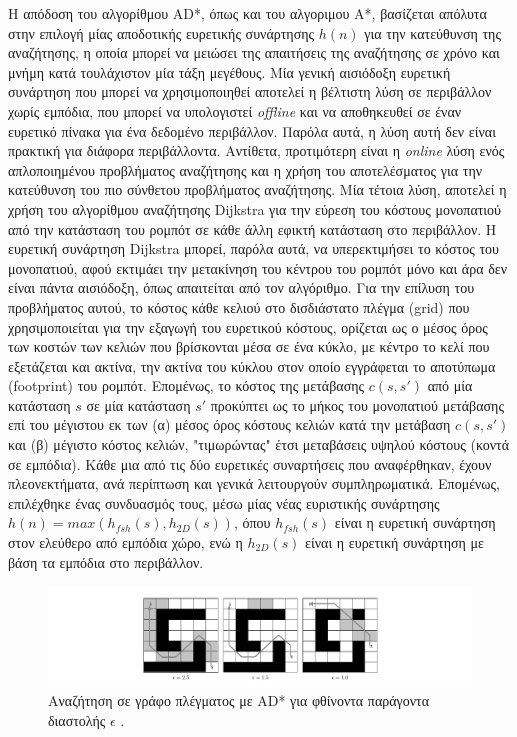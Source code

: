 \bigskip
Η απόδοση του αλγορίθμου AD*, όπως και του αλγοριμου Α*, βασίζεται απόλυτα στην επιλογή μίας αποδοτικής ευρετικής συνάρτησης $h(n)$ για την κατεύθυνση της αναζήτησης, η οποία μπορεί να μειώσει της απαιτήσεις της αναζήτησης σε χρόνο και μνήμη κατά τουλάχιστον μία τάξη μεγέθους. Μία γενική αισιόδοξη ευρετική συνάρτηση που μπορεί να χρησιμοποιηθεί αποτελεί η βέλτιστη λύση σε περιβάλλον χωρίς εμπόδια, που μπορεί να υπολογιστεί \textit{offline} και να αποθηκευθεί σε έναν ευρετικό πίνακα για ένα δεδομένο περιβάλλον. Παρόλα αυτά, η λύση αυτή δεν είναι πρακτική για διάφορα περιβάλλοντα. Αντίθετα, προτιμότερη είναι η \textit{online} λύση ενός απλοποιημένου προβλήματος αναζήτησης και η χρήση του αποτελέσματος για την κατεύθυνση του πιο σύνθετου προβλήματος αναζήτησης. Μία τέτοια λύση, αποτελεί η χρήση του αλγορίθμου αναζήτησης Dijkstra για την εύρεση του κόστους μονοπατιού από την κατάσταση του ρομπότ σε κάθε άλλη εφικτή κατάσταση στο περιβάλλον. Η ευρετική συνάρτηση Dijkstra μπορεί, παρόλα αυτά, να υπερεκτιμήσει το κόστος του μονοπατιού, αφού εκτιμάει την μετακίνηση του κέντρου του ρομπότ μόνο και άρα δεν είναι πάντα αισιόδοξη, όπως απαιτείται από τον αλγόριθμο. Για την επίλυση του προβλήματος αυτού, το κόστος κάθε κελιού στο δισδιάστατο πλέγμα (grid) που χρησιμοποιείται για την εξαγωγή του ευρετικού κόστους, ορίζεται ως ο μέσος όρος των κοστών των κελιών που βρίσκονται μέσα σε ένα κύκλο, με κέντρο το κελί που εξετάζεται και ακτίνα, την ακτίνα του κύκλου στον οποίο εγγράφεται το αποτύπωμα (footprint) του ρομπότ. Επομένως, το κόστος της μετάβασης $c(s,s')$ από μία κατάσταση $s$ σε μία κατάσταση $s'$ προκύπτει ως το μήκος του μονοπατιού μετάβασης επί του μέγιστου εκ των (α) μέσος όρος κόστους κελιών κατά την μετάβαση $c(s,s')$ και (β) μέγιστο κόστος κελιών, "τιμωρώντας" έτσι μεταβάσεις υψηλού κόστους (κοντά σε εμπόδια). Κάθε μια από τις δύο ευρετικές συναρτήσεις που αναφέρθηκαν, έχουν πλεονεκτήματα, ανά περίπτωση και γενικά λειτουργούν συμπληρωματικά. Επομένως, επιλέχθηκε ένας συνδυασμός τους, μέσω μίας νέας ευριστικής συνάρτησης $h(n)=max(h_{fsh}(s), h_{2D}(s))$, όπου $h_{fsh}(s)$ είναι η ευρετική συνάρτηση στον ελεύθερο από εμπόδια χώρο, ενώ η $h_{2D}(s)$ είναι η ευρετική συνάρτηση με βάση τα εμπόδια στο περιβάλλον.

\begin{figure}[!ht]
	\centering
	\includegraphics[width=\linewidth]{Chapters/Chapter3/Figures/adstar.png}
	\caption[Αναζήτηση σε γράφο πλέγματος με AD* για μειούμενο παράγοντα διαστολής $\epsilon$.]{Αναζήτηση σε γράφο πλέγματος με ΑD* για φθίνοντα παράγοντα διαστολής $\epsilon$ \cite{adstar}.}
	\label{fig:adstar}
\end{figure}

